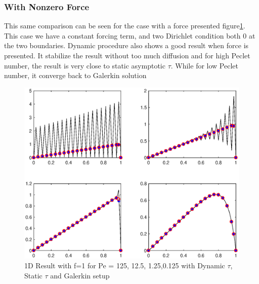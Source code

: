 \documentclass[10pt]{article}
\begin{document}
\subsubsection{With Nonzero Force}
This same comparison can be seen for the case with a force presented figure\ref{feq1}. This case we have a constant forcing term, and two Dirichlet condition both 0 at the two boundaries. Dynamic procedure also shows a good result when force is presented. It stabilize the result without too much diffusion and for high Peclet number, the result is very close to static asymptotic $\tau$. While for low Peclet number, it converge back to Galerkin solution
\begin{figure}[h!]
	\begin{center}
	\includegraphics[width=1.0\textwidth, clip]{./figure/feq1.eps}
	\end{center}
		\vspace{0mm}
    \caption{1D Result with f=1 for Pe = 125, 12.5, 1.25,0.125 with Dynamic $\tau$, Static $\tau$ and Galerkin setup}
  	\label{feq1}
\end{figure}
\end{document}
